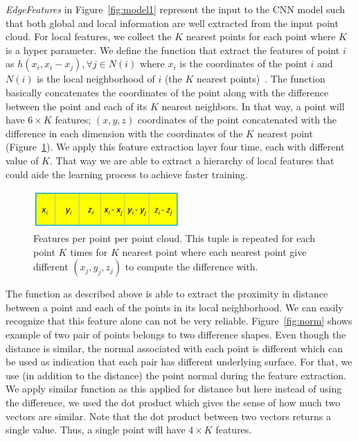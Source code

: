 \emph{EdgeFeatures} in Figure~\ref{fig:model1} represent the input to the CNN model such that both global and local information   are well extracted from the input point cloud. For local features, we collect the $K$ nearest points for each point where $K$ is a hyper parameter. We define the function that extract the features of point $i$ as $h(x_{i}, x_{i}-x_{j}), \forall j \in N(i)$ where $x_{i}$ is the coordinates of the point $i$ and $N(i)$ is the local neighborhood of $i$ (the $K$ nearest points)~\citep{wang2018dynamic}. The function basically concatenates the coordinates of the point along with the difference between the point and each of its $K$ nearest neighbors. In that way, a point will have $6\times K$ features; $(x,y,z)$ coordinates of the point concatenated with the difference in each dimension with the coordinates of the $K$ nearest point (Figure~\ref{fig:features}). We apply this feature extraction layer four time, each with different value of $K$. That way we are able to extract a hierarchy of local features that could aide the learning process to achieve faster training. 
\begin{figure}[!tbh]
\includegraphics[width=0.5\textwidth]{fig/features.JPG}
\caption{Features per point per point cloud. This tuple is repeated for each point $K$ times for $K$ nearest point where each nearest point give different $(x_{j}, y_{j}, z_{j})$ to compute the difference with. }
\label{fig:features}
\end{figure}

The function as described above is able to extract the proximity in distance between a point and each of the points in its local neighborhood. We can easily recognize that this feature alone can not be very reliable. Figure~\ref{fig:norm} shows example of two pair of points belongs to two difference shapes. Even though the distance is similar, the normal associated with each point is different which can be used as indication that each pair has different underlying surface. For that, we use (in addition to the distance) the point normal during the feature extraction. We apply similar function as this applied for distance but here instead of using the difference, we used the dot product which gives the sense of how much two vectors are similar. Note that the dot product between two vectors returns a single value. Thus, a single point will have $4\times K$ features.

